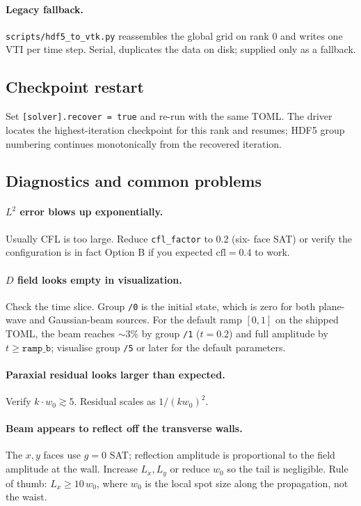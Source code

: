 \documentclass[11pt]{article}
\begin{document}
\paragraph{Legacy fallback.}
\texttt{scripts/hdf5\_to\_vtk.py} reassembles the global grid on
rank 0 and writes one VTI per time step.  Serial, duplicates the
data on disk; supplied only as a fallback.

\subsection{Checkpoint restart}

Set \texttt{[solver].recover = true} and re-run with the same
TOML.  The driver locates the highest-iteration checkpoint for
this rank and resumes; HDF5 group numbering continues monotonically
from the recovered iteration.

\subsection{Diagnostics and common problems}

\paragraph{$L^2$ error blows up exponentially.}
Usually CFL is too large.  Reduce \texttt{cfl\_factor} to 0.2 (six-
face SAT) or verify the configuration is in fact Option B if you
expected $\mathrm{cfl} = 0.4$ to work.

\paragraph{$D$ field looks empty in visualization.}
Check the time slice.  Group \texttt{/0} is the initial state,
which is zero for both plane-wave and Gaussian-beam sources.  For
the default ramp $[0, 1]$ on the shipped TOML, the beam reaches
${\sim}3\%$ by group \texttt{/1} ($t = 0.2$) and full amplitude by
$t \geq \mathtt{ramp\_b}$; visualise group \texttt{/5} or later
for the default parameters.

\paragraph{Paraxial residual looks larger than expected.}
Verify $k\cdot w_0 \gtrsim 5$.  Residual scales as $1/(kw_0)^2$.

\paragraph{Beam appears to reflect off the transverse walls.}
The $x, y$ faces use $g = 0$ SAT; reflection amplitude is
proportional to the field amplitude at the wall.  Increase $L_x,
L_y$ or reduce $w_0$ so the tail is negligible.  Rule of thumb:
$L_x \geq 10\, w_0$, where $w_0$ is the local spot size along the
propagation, not the waist.
\end{document}
